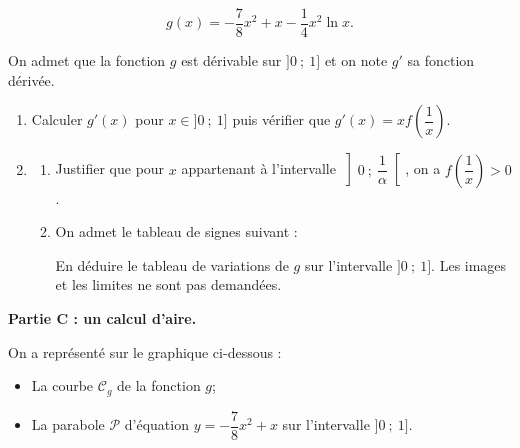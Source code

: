 \documentclass[10pt]{article}
\begin{document}
\[g(x) = -\dfrac{7}{8} x^{2}+ x - \dfrac{1}{4} x^{2} \ln x.\]

On admet que la fonction $g$ est dérivable sur $] 0~;~1]$ et on note $g'$ sa fonction dérivée.

\begin{enumerate}
	\item Calculer $g'(x)$ pour $x \in ] 0~;~1]$ puis vérifier que $g'(x)=x f\left(\dfrac{1}{x}\right)$.

	\item \begin{enumerate}
		\item Justifier que pour $x$ appartenant à l'intervalle $\left] 0~;~\dfrac{1}{\alpha}\right[$, on a $f\left(\dfrac{1}{x}\right)>0$.

		\item On admet le tableau de signes suivant :

		\begin{center}
		\end{center}

		En déduire le tableau de variations de $g$ sur l'intervalle $] 0~;~1]$. Les images et les limites ne sont pas demandées.
		\end{enumerate}
	\end{enumerate}

\medskip

\textbf{Partie C : un calcul d'aire.}

\smallskip

On a représenté sur le graphique ci-dessous :

\begin{itemize}
\item La courbe $\mathcal{C}_{g}$ de la fonction $g$;

\item La parabole $\mathcal{P}$ d'équation $y=-\dfrac{7}{8} x^{2}+x$ sur l'intervalle $]0~;~1]$.

\end{itemize}
\end{document}
